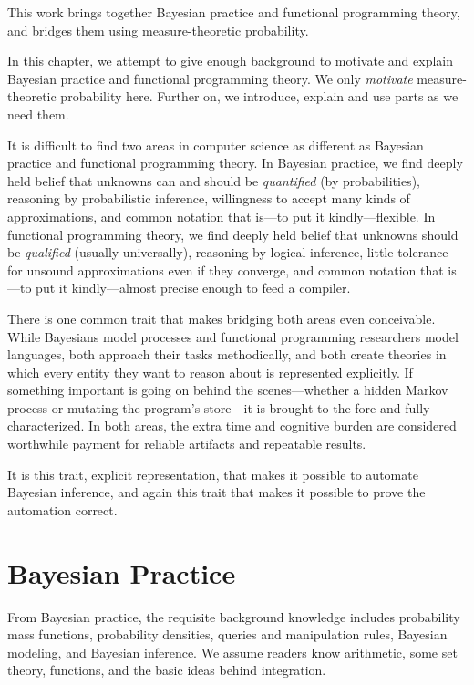 This work brings together Bayesian practice and functional programming theory, and bridges them using measure-theoretic probability.

In this chapter, we attempt to give enough background to motivate and explain Bayesian practice and functional programming theory.
We only \emph{motivate} measure-theoretic probability here.
Further on, we introduce, explain and use parts as we need them.

It is difficult to find two areas in computer science as different as Bayesian practice and functional programming theory.
In Bayesian practice, we find deeply held belief that unknowns can and should be \emph{quantified} (by probabilities), reasoning by probabilistic inference, willingness to accept many kinds of approximations, and common notation that is---to put it kindly---flexible.
In functional programming theory, we find deeply held belief that unknowns should be \emph{qualified} (usually universally), reasoning by logical inference, little tolerance for unsound approximations even if they converge, and common notation that is---to put it kindly---almost precise enough to feed a compiler.

There is one common trait that makes bridging both areas even conceivable.
While Bayesians model processes and functional programming researchers model languages, both approach their tasks methodically, and both create theories in which every entity they want to reason about is represented explicitly.
If something important is going on behind the scenes---whether a hidden Markov process or mutating the program's store---it is brought to the fore and fully characterized.
In both areas, the extra time and cognitive burden are considered worthwhile payment for reliable artifacts and repeatable results.

It is this trait, explicit representation, that makes it possible to automate Bayesian inference, and again this trait that makes it possible to prove the automation correct.


\section{Bayesian Practice}

From Bayesian practice, the requisite background knowledge includes probability mass functions, probability densities, queries and manipulation rules, Bayesian modeling, and Bayesian inference.
We assume readers know arithmetic, some set theory, functions, and the basic ideas behind integration.

